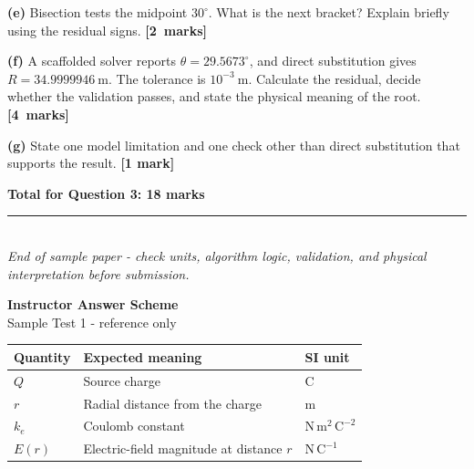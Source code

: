 \documentclass[11pt,a4paper]{article}
\newcommand{\qmarks}[1]{\hfill\mbox{\textbf{[#1 marks]}}}
\newcommand{\questiontitle}[1]{\vspace{5pt}{\large\color{navy}\textbf{#1}}\par\vspace{2pt}}
\begin{document}
\textbf{(e)} Bisection tests the midpoint \(30^\circ\). What is the next bracket? Explain briefly using the residual signs. \qmarks{2}

\textbf{(f)} A scaffolded solver reports \(\theta=29.5673^\circ\), and direct substitution gives \(R=34.9999946\ \mathrm{m}\). The tolerance is \(10^{-3}\ \mathrm{m}\). Calculate the residual, decide whether the validation passes, and state the physical meaning of the root. \qmarks{4}

\textbf{(g)} State one model limitation and one check other than direct substitution that supports the result. \hfill\textbf{[1 mark]}

\textbf{Total for Question 3: 18 marks}

\vfill
\begin{center}
  \color{teal}\rule{0.75\textwidth}{0.5pt}\\[3pt]
  \small\textit{End of sample paper - check units, algorithm logic, validation, and physical interpretation before submission.}
\end{center}

\newpage
\thispagestyle{fancy}
\begin{center}
  {\LARGE\color{navy}\textbf{Instructor Answer Scheme}}\\[4pt]
  {\large Sample Test 1 - reference only}
\end{center}


\questiontitle{Question 1 - 16 marks}

\begin{center}
\begin{tabularx}{0.96\textwidth}{@{}>{\raggedright\arraybackslash}p{} X >{\raggedright\arraybackslash}p{}@{}}
\toprule
Quantity & Expected meaning & SI unit \\
\midrule
\(Q\) & Source charge & \(\mathrm{C}\) \\
\(r\) & Radial distance from the charge & \(\mathrm{m}\) \\
\(k_e\) & Coulomb constant & \(\mathrm{N\,m^2\,C^{-2}}\) \\
\(E(r)\) & Electric-field magnitude at distance \(r\) & \(\mathrm{N\,C^{-1}}\) \\
\bottomrule
\end{tabularx}
\end{center}
\end{document}
